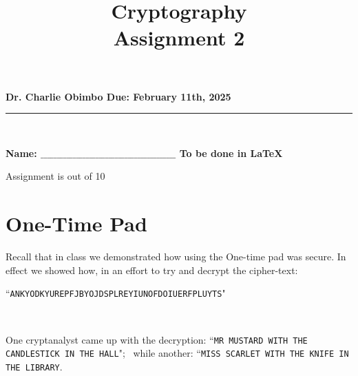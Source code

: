 \documentclass[12pt,emtex]{article}
\begin{document}
\title{\vspace{-25mm} \bf Cryptography 
\\ Assignment 2}
\date{}
\maketitle

\vspace{-20mm}

\begin{center}
	{\bf Dr. Charlie Obimbo \hfill Due:  February 11th, 2025}
\end{center}

\hrule

\vspace{6mm}

\

\noindent
{\bf Name: $\_\_\_\_\_\_\_\_\_\_\_\_\_\_\_\_\_\_\_\_\_\_\_\_\_\_\_\_\_\_\_\_\_\_\_\_\_\_\_\_\_\_$ \hspace{20mm} \hfill 
    To be done  in \LaTeX
}

\hfill Assignment is out of 10



	
\section{One-Time Pad}


Recall that in class we demonstrated how using the One-time pad was secure. In effect we showed how, in an effort to try and decrypt the cipher-text:

\medskip

``\texttt{ANKYODKYUREPFJBYOJDSPLREYIUNOFDOIUERFPLUYTS}"

\

\noindent
One cryptanalyst came up with the decryption:
``\texttt{MR MUSTARD WITH THE CANDLESTICK IN THE HALL}"; 
\
while another: 
``\texttt{MISS SCARLET WITH THE KNIFE IN THE LIBRARY}.
\end{document}
